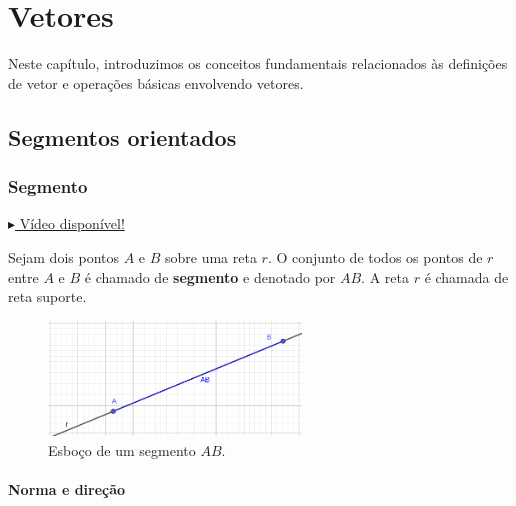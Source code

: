 
\chapter{Vetores}\label{cap_vetor}
\thispagestyle{fancy}

Neste capítulo, introduzimos os conceitos fundamentais relacionados às definições de vetor e operações básicas envolvendo vetores.

\section{Segmentos orientados}\label{cap_vetor_sec_segorien}

\subsection{Segmento}

\begin{flushright}
  \href{https://archive.org/details/definicao-de-segmento}{$\blacktriangleright$ Vídeo disponível!}
\end{flushright}

Sejam dois pontos $A$ e $B$ sobre uma reta $r$. O conjunto de todos os pontos de $r$ entre $A$ e $B$ é chamado de {\bf segmento} e denotado por $AB$. A reta $r$ é chamada de reta suporte.

\begin{figure}[H]
  \centering
  \includegraphics[width=0.6\textwidth]{./cap_vetor/dados/fig_segmento/fig_segmento}
  \caption{Esboço de um segmento $AB$.}
  \label{fig:segmento}
\end{figure}

\subsubsection{Norma e direção}

